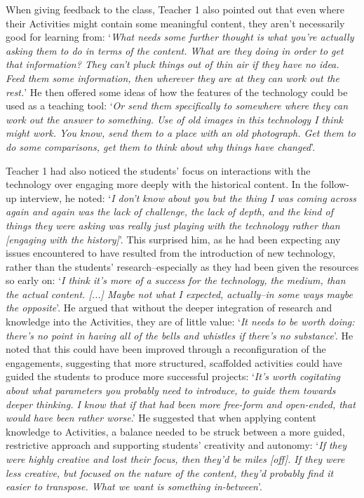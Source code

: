 \documentclass[,hyphens]{sigchi}
\begin{document}
When giving feedback to the class, Teacher 1 also pointed out that even where their Activities might contain some meaningful content, they aren't necessarily good for learning from: `\textit{What needs some further thought is what you're actually asking them to do in terms of the content. What are they doing in order to get that information? They can't pluck things out of thin air if they have no idea. Feed them some information, then wherever they are at they can work out the rest.}' He then offered some ideas of how the features of the technology could be used as a teaching tool: `\textit{Or send them specifically to somewhere where they can work out the answer to something. Use of old images in this technology I think might work. You know, send them to a place with an old photograph. Get them to do some comparisons, get them to think about why things have changed}'.

Teacher 1 had also noticed the students' focus on interactions with the technology over engaging more deeply with the historical content. In the follow-up interview, he noted: `\textit{I don't know about you but the thing I was coming across again and again was the lack of challenge, the lack of depth, and the kind of things they were asking was really just playing with the technology rather than [engaging with the history]}'. This surprised him, as he had been expecting any issues encountered to have resulted from the introduction of new technology, rather than the students' research--especially as they had been given the resources so early on: `\textit{I think it's more of a success for the technology, the medium, than the actual content. [...] Maybe not what I expected, actually--in some ways maybe the opposite}'. He argued that without the deeper integration of research and knowledge into the Activities, they are of little value: `\textit{It needs to be worth doing: there's no point in having all of the bells and whistles if there's no substance}'. He noted that this could have been improved through a reconfiguration of the engagements, suggesting that more structured, scaffolded activities could have guided the students to produce more successful projects: `\textit{It's worth cogitating about what parameters you probably need to introduce, to guide them towards deeper thinking. I know that if that had been more free-form and open-ended, that would have been rather worse}.' He suggested that when applying content knowledge to Activities, a balance needed to be struck between a more guided, restrictive approach and supporting students' creativity and autonomy: `\textit{If they were highly creative and lost their focus, then they'd be miles [off]. If they were less creative, but focused on the nature of the content, they'd probably find it easier to transpose. What we want is something in-between}'.
\end{document}
